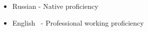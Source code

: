 

\begin{cvparagraph}

    \begin{itemize}[leftmargin=2ex, nosep, noitemsep]
        \item Russian - Native proficiency
        \item English  - Professional working proficiency
    \end{itemize}

\end{cvparagraph}